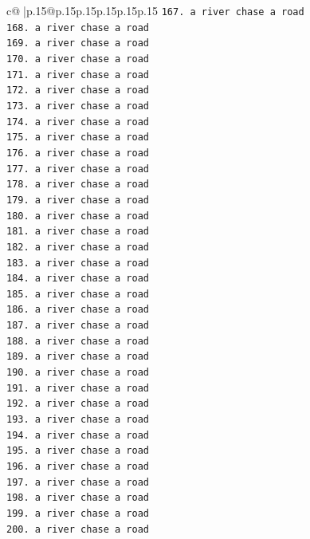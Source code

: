 \documentclass{article}
\begin{document}
{\begin{supertabular}{c@{$\;$}|p{.15\linewidth}@{}p{.15\linewidth}p{.15\linewidth}p{.15\linewidth}p{.15\linewidth}p{.15\linewidth}}
{{{\texttt{167. a river chase a road} \\
\texttt{168. a river chase a road} \\
\texttt{169. a river chase a road} \\
\texttt{170. a river chase a road} \\
\texttt{171. a river chase a road} \\
\texttt{172. a river chase a road} \\
\texttt{173. a river chase a road} \\
\texttt{174. a river chase a road} \\
\texttt{175. a river chase a road} \\
\texttt{176. a river chase a road} \\
\texttt{177. a river chase a road} \\
\texttt{178. a river chase a road} \\
\texttt{179. a river chase a road} \\
\texttt{180. a river chase a road} \\
\texttt{181. a river chase a road} \\
\texttt{182. a river chase a road} \\
\texttt{183. a river chase a road} \\
\texttt{184. a river chase a road} \\
\texttt{185. a river chase a road} \\
\texttt{186. a river chase a road} \\
\texttt{187. a river chase a road} \\
\texttt{188. a river chase a road} \\
\texttt{189. a river chase a road} \\
\texttt{190. a river chase a road} \\
\texttt{191. a river chase a road} \\
\texttt{192. a river chase a road} \\
\texttt{193. a river chase a road} \\
\texttt{194. a river chase a road} \\
\texttt{195. a river chase a road} \\
\texttt{196. a river chase a road} \\
\texttt{197. a river chase a road} \\
\texttt{198. a river chase a road} \\
\texttt{199. a river chase a road} \\
\texttt{200. a river chase a road} \\
}}}
\end{supertabular}}
\end{document}
